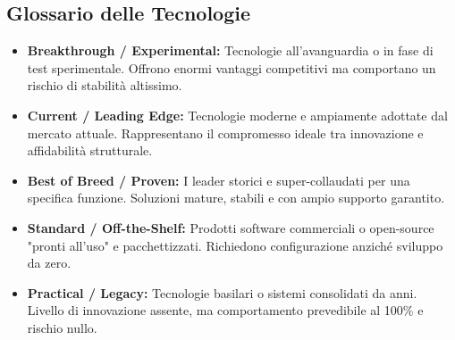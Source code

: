 \documentclass[12pt, a4paper]{article}
\begin{document}
\subsection*{Glossario delle Tecnologie}
\begin{itemize}[label=\textbullet, itemsep=0.5em]
    \item \textbf{Breakthrough / Experimental:} Tecnologie all'avanguardia o in fase di test sperimentale. Offrono enormi vantaggi competitivi ma comportano un rischio di stabilità altissimo.
    \item \textbf{Current / Leading Edge:} Tecnologie moderne e ampiamente adottate dal mercato attuale. Rappresentano il compromesso ideale tra innovazione e affidabilità strutturale.
    \item \textbf{Best of Breed / Proven:} I leader storici e super-collaudati per una specifica funzione. Soluzioni mature, stabili e con ampio supporto garantito.
    \item \textbf{Standard / Off-the-Shelf:} Prodotti software commerciali o open-source "pronti all'uso" e pacchettizzati. Richiedono configurazione anziché sviluppo da zero.
    \item \textbf{Practical / Legacy:} Tecnologie basilari o sistemi consolidati da anni. Livello di innovazione assente, ma comportamento prevedibile al 100\% e rischio nullo.
\end{itemize}
\end{document}
